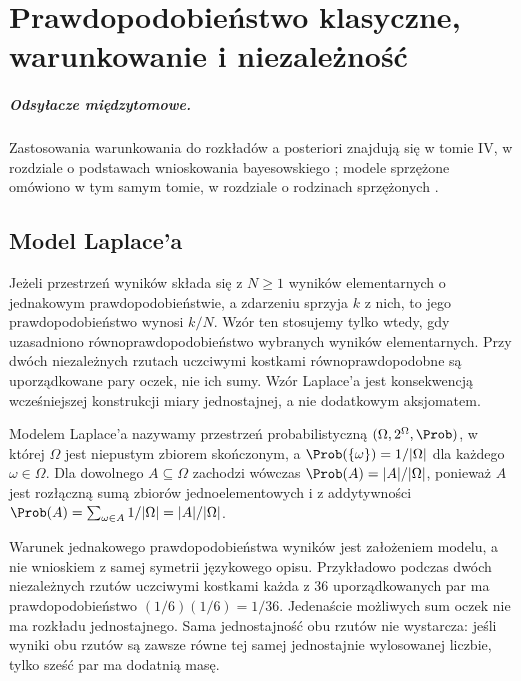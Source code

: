 \chapter{Prawdopodobieństwo klasyczne, warunkowanie i niezależność}
\label{ch:conditioning}
\paragraph{Odsyłacze międzytomowe.}
Zastosowania warunkowania do rozkładów a posteriori
znajdują się w tomie IV, w rozdziale o podstawach
wnioskowania bayesowskiego%
;
modele sprzężone omówiono w tym samym tomie,
w rozdziale o rodzinach sprzężonych%
.


\section{Model Laplace'a}
Jeżeli przestrzeń wyników składa się z $N\geq1$ wyników
elementarnych o jednakowym prawdopodobieństwie, a zdarzeniu
sprzyja $k$ z nich, to jego prawdopodobieństwo wynosi $k/N$. Wzór ten stosujemy tylko wtedy, gdy uzasadniono
równoprawdopodobieństwo wybranych wyników elementarnych. Przy dwóch niezależnych rzutach uczciwymi kostkami
równoprawdopodobne są uporządkowane pary oczek, nie ich sumy. Wzór Laplace'a jest
konsekwencją wcześniejszej konstrukcji miary jednostajnej,
a nie dodatkowym aksjomatem.

\begin{definicja}
Modelem Laplace'a nazywamy przestrzeń probabilistyczną
$(\Omega,2^\Omega,\Prob)$, w której $\Omega$ jest niepustym zbiorem
skończonym, a $\Prob(\{\omega\})=1/|\Omega|$ dla każdego
$\omega\in\Omega$. Dla dowolnego $A\subseteq\Omega$ zachodzi wówczas
$\Prob(A)=|A|/|\Omega|$, ponieważ $A$ jest rozłączną sumą
zbiorów jednoelementowych i z addytywności
$\Prob(A)=\sum_{\omega\in A}1/|\Omega|=|A|/|\Omega|$.
\end{definicja}

\begin{uwaga}
Warunek jednakowego prawdopodobieństwa wyników jest założeniem
modelu, a nie wnioskiem z samej symetrii językowego opisu.
Przykładowo podczas dwóch niezależnych rzutów uczciwymi kostkami
każda z 36 uporządkowanych par ma prawdopodobieństwo $(1/6)(1/6)=1/36$.
Jedenaście możliwych sum oczek nie ma rozkładu jednostajnego.
Sama jednostajność obu rzutów nie wystarcza: jeśli wyniki obu
rzutów są zawsze równe tej samej jednostajnie wylosowanej liczbie,
tylko sześć par ma dodatnią masę.
\end{uwaga}


